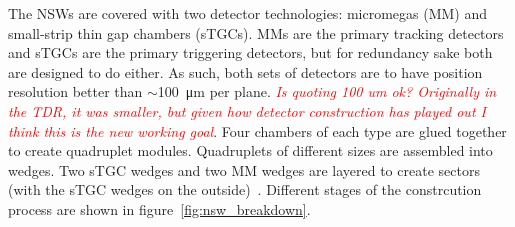 The NSWs are covered with two detector technologies: micromegas (MM) and small-strip thin gap chambers (sTGCs). MMs are the primary tracking detectors and sTGCs are the primary triggering detectors, but for redundancy sake both are designed to do either. As such, both sets of detectors are to have position resolution better than $\sim$\SI{100}{\micro\meter} per plane. \textcolor{red}{\textit{Is quoting 100 um ok? Originally in the TDR, it was smaller, but given how detector construction has played out I think this is the new working goal}}. Four chambers of each type are glued together to create quadruplet modules. Quadruplets of different sizes are assembled into wedges. Two sTGC wedges and two MM wedges are layered to create sectors (with the sTGC wedges on the outside)~\cite{nsw_tdr}. Different stages of the constrcution process are shown in figure~\ref{fig:nsw_breakdown}.%
\newpage
\thispagestyle{empty}
